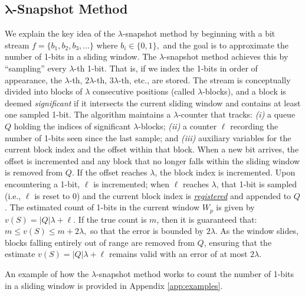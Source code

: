 \subsection{$\boldsymbol{\lambda}$-Snapshot Method}

We explain the key idea of the $\lambda$-snapshot method \cite{LeeT06} by beginning with a bit stream
\(
f = \{b_1, b_2, b_3, \dots\}
\)
where 
\(
b_i \in \{0,1\},
\)
and the goal is to approximate the number of 1-bits in a sliding window. The \(\lambda\)-snapshot method achieves this by “sampling” every \(\lambda\)-th 1-bit. That is, if we index the 1-bits in order of appearance, the \(\lambda\)-th, \(2\lambda\)-th, \(3\lambda\)-th, etc., are stored. The stream is conceptually divided into blocks of \(\lambda\) consecutive positions (called \(\lambda\)-blocks), and a block is deemed \emph{significant} if it intersects the current sliding window and contains at least one sampled 1-bit. The algorithm maintains a \(\lambda\)-counter that tracks: {\em (i)} a queue \(Q\) holding the indices of significant \(\lambda\)-blocks; {\em (ii)} a counter \(\ell\) recording the number of 1-bits seen since the last sample; and {\em (iii)} auxiliary variables for the current block index and the offset within that block. When a new bit arrives, the offset is incremented and any block that no longer falls within the sliding window is removed from \(Q\). If the offset reaches \(\lambda\), the block index is incremented. Upon encountering a 1-bit, \(\ell\) is incremented; when \(\ell\) reaches \(\lambda\), that 1-bit is sampled (i.e., \(\ell\) is reset to 0) and the current block index is \underline{\em registered} and appended to \(Q\). The estimated count of 1-bits in the current window \(W_p\) is given by
\(
v(S) = |Q|\lambda + \ell.
\)
If the true count is \(m\), then it is guaranteed that:
\(
m \le v(S) \le m + 2\lambda,
\)
so that the error is bounded by \(2\lambda\). As the window slides, blocks falling entirely out of range are removed from \(Q\), ensuring that the estimate \(v(S) = |Q|\lambda + \ell\) remains valid with an error of at most \(2\lambda\). 

An example of how the $\lambda$-snapshot method works to count the number of 1-bits in a sliding window is provided in Appendix \ref{app:examples}.





